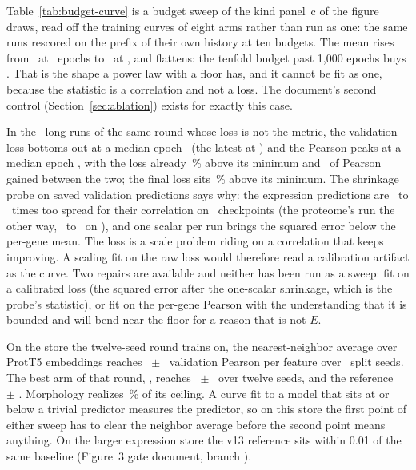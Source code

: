 

Table~\ref{tab:budget-curve} is a budget sweep of the kind panel~c of the figure
draws, read off the training curves of eight arms rather than run as one: the same
runs rescored on the prefix of their own history at ten budgets. The mean rises from
\budgetFirstMean\ at \budgetFirstEpochs\ epochs to \budgetLastMean\ at
\budgetLastEpochs, and flattens: the tenfold budget past 1{,}000 epochs buys
\budgetGainPastThousand. That is the shape a power law with a floor has, and it
cannot be fit as one, because the statistic is a correlation and not a loss. The
document's second control (Section~\ref{sec:ablation}) exists for exactly this case.



In the \lossLiveRuns\ long runs of the same round whose loss is not the metric, the
validation loss bottoms out at a median epoch \lossMinEpochMedian\ (the latest at
\lossMinEpochMax) and the Pearson peaks at a median epoch \lossPeakEpochMedian, with
the loss already \lossAtPeakExcessPct\,\% above its minimum and
\lossGainAfterMin\ of Pearson gained between the two; the final loss sits
\lossFinalExcessPct\,\% above its minimum. The shrinkage probe on saved validation
predictions says why: the expression predictions are \shrinkSpreadMin\ to
\shrinkSpreadMax\ times too spread for their correlation on \shrinkRuns\ checkpoints
(the proteome's run the other way, \shrinkProtSpreadMin\ to \shrinkProtSpreadMax\ on
\shrinkProtRuns), and one scalar per run brings the squared error below the per-gene
mean. The loss is
a scale problem riding on a correlation that keeps improving. A scaling fit on the
raw loss would therefore read a calibration artifact as the curve. Two repairs are
available and neither has been run as a sweep: fit on a calibrated loss (the squared
error after the one-scalar shrinkage, which is the probe's statistic), or fit on the
per-gene Pearson with the understanding that it is bounded and will bend near the
floor for a reason that is not $E$.

On the store the twelve-seed round trains on, the nearest-neighbor average over
ProtT5 embeddings reaches \exprBar\ $\pm$ \exprBarSd\ validation Pearson per feature
over \exprBarSeeds\ split seeds. The best arm of that round, \texttt{\vBestArm},
reaches \vBestMean\ $\pm$ \vBestSd\ over twelve seeds, and the reference
\vRefMean\ $\pm$ \vRefSd. Morphology realizes \morphRealized\,\% of its ceiling. A
curve fit to a model that sits at or below a trivial predictor measures the predictor,
so on this store the first point of either sweep has to clear the neighbor average
before the second point means anything. On the larger expression store the v13
reference sits within 0.01 of the same baseline (Figure~3 gate document, branch
).

